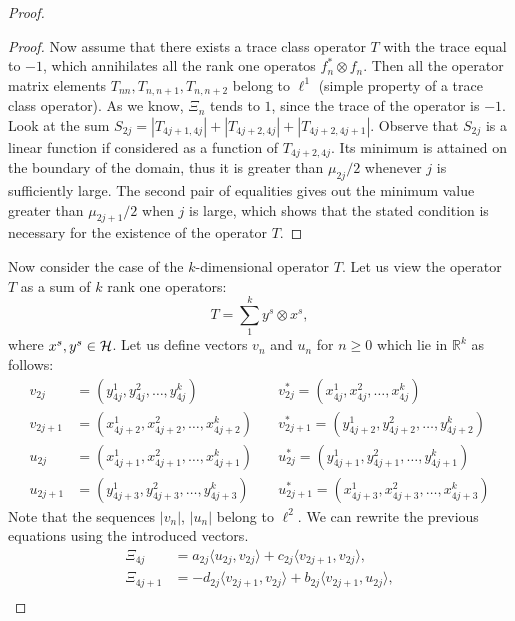 \begin{proof}
\begin{proof}
        \medskip
        Now assume that there exists a trace class operator $T$ with the trace equal to $-1$, which annihilates all the rank one operatos $f^*_n \otimes f_n$.
        Then all the operator matrix elements $T_{nn}, T_{n, n+1}, T_{n, n+2}$ belong to $\ell^1$ (simple property of a trace class operator).
        As we know, $\Xi_n$ tends to $1$, since the trace of the operator is $-1$.
        Look at the sum $S_{2j} = |T_{4j+1, 4j}| + |T_{4j+2,4j}| + |T_{4j+2,4j+1}|$.
        Observe that $S_{2j}$ is a linear function if considered as a function of $T_{4j+2, 4j}$.
        Its minimum is attained on the boundary of the domain, thus it is greater than $\mu_{2j}/2$ whenever $j$ is sufficiently large.
        The second pair of equalities gives out the minimum value greater than $\mu_{2j+1}/2$ when $j$ is large,
          which shows that the stated condition is necessary for the existence of the operator $T$.
      \end{proof}
      Now consider the case of the $k$-dimensional operator $T$.
      Let us view the operator $T$ as a sum of $k$ rank one operators:
      \[
        T = \sum_1^k y^s \otimes x^s,
      \]
        where $x^s, y^s \in \cal{H}$.
      Let us define vectors $v_n$ and $u_n$ for $n \geq 0 $ which lie in $\mathbb{R}^k$ as follows:
      \begin{align*}
        v_{2j} &= (y^1_{4j}, y^2_{4j}, \dots ,y^k_{4j}) \quad
        &v^*_{2j} = (x^1_{4j}, x^2_{4j}, \dots ,x^k_{4j}) \\
        v_{2j+1} &= (x^1_{4j+2}, x^2_{4j+2}, \dots ,x^k_{4j+2}) \quad
        &v^*_{2j+1} = (y^1_{4j+2}, y^2_{4j+2}, \dots ,y^k_{4j+2}) \\
        u_{2j} &= (x^1_{4j+1}, x^2_{4j+1}, \dots ,x^k_{4j+1}) \quad
        &u^*_{2j} = (y^1_{4j+1}, y^2_{4j+1}, \dots ,y^k_{4j+1}) \\
        u_{2j+1} &= (y^1_{4j+3}, y^2_{4j+3}, \dots ,y^k_{4j+3}) \quad
        &u^*_{2j+1} = (x^1_{4j+3}, x^2_{4j+3}, \dots ,x^k_{4j+3}) 
      \end{align*}
      Note that the sequences $|v_n|$, $|u_n|$ belong to $\ell^2$.
      We can rewrite the previous equations using the introduced vectors.
      \begin{align*}
        \Xi_{4j} &= a_{2j} \langle u_{2j}, v_{2j}\rangle + c_{2j} \langle v_{2j+1}, v_{2j}\rangle,\\
        \Xi_{4j + 1} &= -d_{2j} \langle v_{2j+1}, v_{2j}\rangle + b_{2j} \langle v_{2j+1}, u_{2j}\rangle,\\

\end{align*}
\end{proof}
